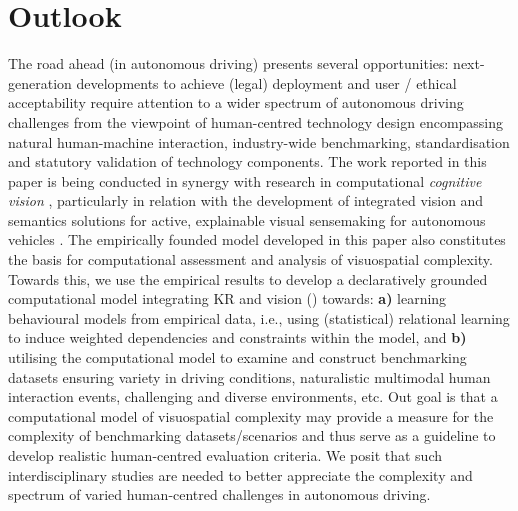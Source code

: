 \documentclass[a4paper]{article}
\begin{document}
\section{\sffamily Outlook} \label{outlook}
The road ahead (in autonomous driving) presents several opportunities:  next-generation  developments to achieve (legal) deployment and user / ethical acceptability require attention to a wider spectrum of autonomous driving challenges from the viewpoint of human-centred technology design encompassing natural human-machine interaction, industry-wide benchmarking, standardisation and statutory validation of technology components.  The work reported in this paper is being conducted in synergy with research in computational \emph{cognitive vision} \cite{BhattECAI20}, particularly  in relation with the development of integrated vision and semantics solutions for active, explainable visual sensemaking for autonomous vehicles \cite{SuchanECAI20,SuchanIJCAI19}. The empirically founded model developed in this paper also constitutes the basis for computational assessment and analysis of visuospatial complexity. Towards this, we use the empirical results to develop a declaratively grounded computational model integrating KR and vision (\cite{CogSys-Symmetry-2018,DBLP:conf/ilp/SuchanBS16}) towards: \textbf{a)} learning behavioural models from empirical data, i.e., using (statistical) relational learning to induce weighted dependencies and constraints within the model, and \textbf{b)} utilising the computational model to examine and construct benchmarking datasets ensuring variety in driving conditions, naturalistic multimodal human interaction events, challenging and diverse environments, etc. Out goal is that a computational model of visuospatial complexity may provide a measure for the complexity of benchmarking datasets/scenarios and thus serve as a guideline to develop realistic human-centred evaluation criteria. We posit that such interdisciplinary studies are needed to better appreciate the complexity and spectrum of varied human-centred challenges in autonomous driving.
\end{document}
